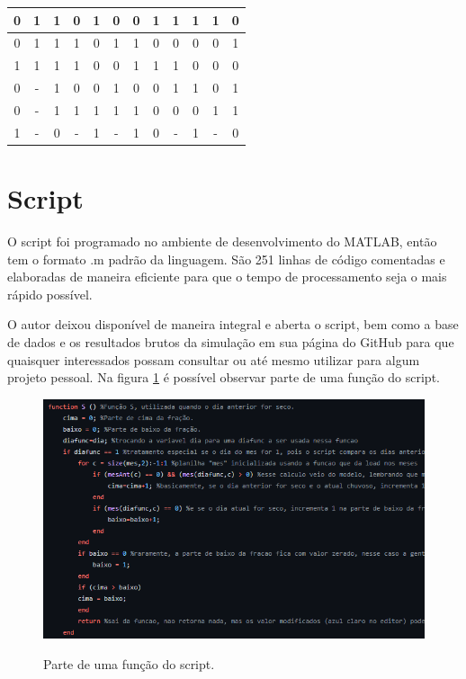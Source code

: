 \begin{table}[H]
\begin{tabular}{|c|c|c|c|c|c|c|c|c|c|c|c|}
0 & 1 & 1 & 0 & 1 & 0 & 0 & 1 & 1 & 1 & 1 & 0 \\ \hline
0 & 1 & 1 & 1 & 0 & 1 & 1 & 0 & 0 & 0 & 0 & 1 \\ \hline
1 & 1 & 1 & 1 & 0 & 0 & 1 & 1 & 1 & 0 & 0 & 0 \\ \hline
0 & - & 1 & 0 & 0 & 1 & 0 & 0 & 1 & 1 & 0 & 1 \\ \hline
0 & - & 1 & 1 & 1 & 1 & 1 & 0 & 0 & 0 & 1 & 1 \\ \hline
1 & - & 0 & - & 1 & - & 1 & 0 & - & 1 & - & 0 \\ \hline
\end{tabular}
\vspace*{15px}
\end{table}



\section{Script}
\label{s.io}
O script foi programado no ambiente de desenvolvimento do MATLAB, então tem o formato .m padrão da linguagem. São 251 linhas de código comentadas e elaboradas de maneira eficiente para que o tempo de processamento seja o mais rápido possível.

O autor deixou disponível de maneira integral e aberta o script, bem como a base de dados e os resultados brutos da simulação em sua página do GitHub \cite{script-tcc} para que quaisquer interessados possam consultar ou até mesmo utilizar para algum projeto pessoal. Na figura \ref{f.example-script} é possível observar parte de uma função do script.

\begin{figure}[H]
	\caption{\small Parte de uma função do script.}
	\centering
	\includegraphics[width=\textwidth]{figs/example-script.png}
	\label{f.example-script}
\end{figure}







